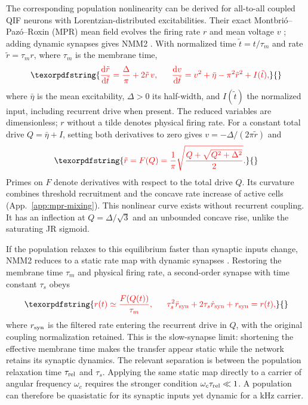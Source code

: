\documentclass[11pt,a4paper]{article}
\providecommand{\DIFdeltex}[1]{{\protect\color{red} \scriptsize #1}} %
\providecommand{\DIFdel}[1]{\texorpdfstring{\DIFdeltex{#1}}{}} %
\begin{document}
\DIFdel{The corresponding population nonlinearity can be derived for all-to-all coupled
QIF neurons with Lorentzian-distributed excitabilities. Their exact
Montbri\'o--Paz\'o--Roxin (MPR) mean field evolves the firing rate $r$ and mean voltage
$v$ \cite{montbrio2015}; adding dynamic synapses gives NMM2
\cite{ruffini2021nmm2,clusella2023}. With normalized time $\tilde t=t/\tau_m$ and rate $\tilde r=\tau_m r$, where $\tau_m$ is the membrane time,
}\begin{displaymath}
\DIFdel{\frac{\mathrm d\tilde r}{\mathrm d\tilde t}=\frac{\Delta}{\pi}+2\tilde r\,v,\qquad
\frac{\mathrm dv}{\mathrm d\tilde t}=v^2+\bar\eta-\pi^2\tilde r^2+I(\tilde t),
}\end{displaymath}%
\DIFdel{where $\bar\eta$ is the mean excitability, $\Delta>0$ its half-width, and $I(\tilde t)$ the
normalized input, including recurrent drive when present. The reduced variables are dimensionless; $r$ without a tilde denotes physical
firing rate. For a constant total drive
$Q=\bar\eta+I$, setting both derivatives to zero gives $v=-\Delta/(2\pi\tilde r)$ and
}\begin{displaymath}
\DIFdel{\tilde r=F(Q)=\frac{1}{\pi}\sqrt{\frac{Q+\sqrt{Q^2+\Delta^2}}{2}} .
}\end{displaymath}%
\DIFdel{Primes on $F$ denote derivatives with respect to the total drive $Q$.
Its curvature combines threshold recruitment and the concave rate increase of
active cells (App.~\ref{app:mpr-mixing}). This nonlinear curve exists
without recurrent coupling. It has an inflection at
$Q=\Delta/\sqrt3$ and an unbounded concave rise, unlike the saturating JR sigmoid.
}%

\DIFdel{If the population relaxes to this equilibrium faster than synaptic inputs change,
NMM2 reduces to a static rate map with dynamic synapses
\cite{ruffini2021nmm2,clusella2023}. Restoring the membrane time $\tau_m$ and physical
firing rate, a second-order synapse with time constant $\tau_s$ obeys
}\begin{displaymath}
\DIFdel{r(t)\simeq \frac{F(Q(t))}{\tau_m},\qquad
\tau_s^2\ddot r_{\rm syn}+2\tau_s\dot r_{\rm syn}+r_{\rm syn}=r(t),
}\end{displaymath}%
\DIFdel{where $r_{\rm syn}$ is the filtered rate entering the recurrent drive in $Q$, with the original
coupling normalization retained. This is the slow-synapse limit: shortening the
effective membrane time makes the transfer appear static while the network retains
its synaptic dynamics. The relevant separation is between the population relaxation
time $\tau_{\rm rel}$ and $\tau_s$. Applying the same static map directly to a
carrier of angular frequency $\omega_c$ requires the stronger condition
$\omega_c\tau_{\rm rel}\ll1$. A population can therefore be quasistatic for its
synaptic inputs yet dynamic for a kHz carrier.
}%
\end{document}
